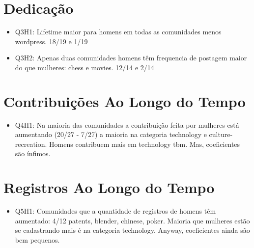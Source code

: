 
\section{Dedicação}%
\label{sec:dedicacao}

\begin{itemize}
	\item Q3H1: Lifetime maior para homens em todas as comunidades menos wordpress. 18/19 e 1/19
	\item Q3H2: Apenas duas comunidades homens têm frequencia de postagem maior do que mulheres: chess e movies. 12/14 e 2/14
\end{itemize}


\section{Contribuições Ao Longo do Tempo}%
\label{sec:tempo}

\begin{itemize}
	\item Q4H1: Na maioria das comunidades a contribuição feita por mulheres está aumentando (20/27 - 7/27) a maioria na categoria technology e culture-recreation. Homens contribuem mais em technology tbm. Mas, coeficientes são ínfimos. 
\end{itemize}


\section{Registros Ao Longo do Tempo}%
\label{sec:registros}

\begin{itemize}
	\item Q5H1: Comunidades que a quantidade de registros de homens têm aumentado: 4/12 patents, blender, chinese, poker. Maioria que mulheres estão se cadastrando mais é na categoria technology. Anyway, coeficientes ainda são bem pequenos.
\end{itemize}

